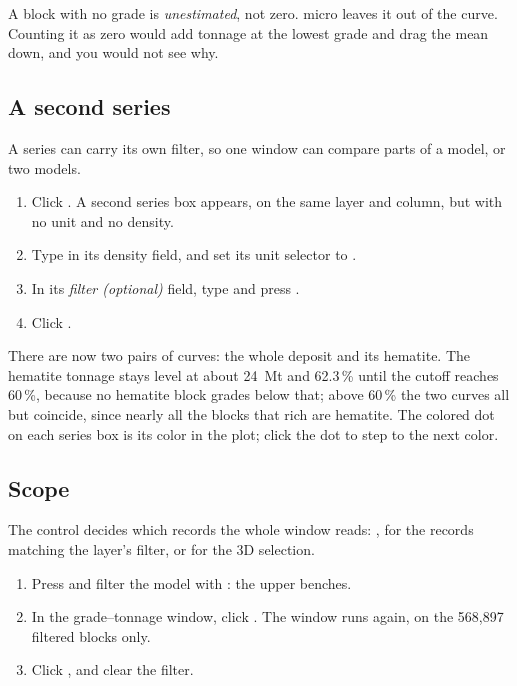 \begin{why}
A block with no grade is \emph{unestimated}, not zero. micro leaves it out of the curve. Counting it as zero would add tonnage at the lowest grade and drag the mean down, and you would not see why.
\end{why}

\subsection{A second series}
A series can carry its own filter, so one window can compare parts of a model, or two models.

\begin{tryit}
\begin{enumerate}
\item Click . A second series box appears, on the same layer and column, but with no unit and no density.
\item Type  in its density field, and set its unit selector to \ui{\%}.
\item In its \emph{filter (optional)} field, type  and press .
\item Click .
\end{enumerate}
\end{tryit}

There are now two pairs of curves: the whole deposit and its hematite. The hematite tonnage stays level at about 24~Mt and 62.3\,\% until the cutoff reaches 60\,\%, because no hematite block grades below that; above 60\,\% the two curves all but coincide, since nearly all the blocks that rich are hematite. The colored dot on each series box is its color in the plot; click the dot to step to the next color.

\subsection{Scope}
The  control decides which records the whole window reads: ,  for the records matching the layer's filter, or  for the 3D selection.

\begin{tryit}
\begin{enumerate}
\item Press \key{/} and filter the model with : the upper benches.
\item In the grade–tonnage window, click . The window runs again, on the 568,897 filtered blocks only.
\item Click , and clear the filter.
\end{enumerate}
\end{tryit}

